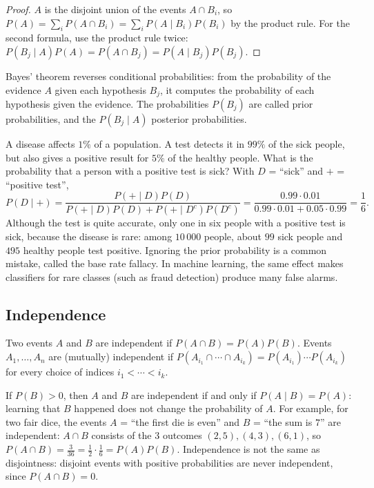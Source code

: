 \begin{proof}
    $A$ is the disjoint union of the events $A \cap B_i$, so $P(A) = \sum_i P(A \cap B_i) = \sum_i P(A \mid B_i)P(B_i)$ by the product rule. For the second formula, use the product rule twice: $P(B_j \mid A)P(A) = P(A \cap B_j) = P(A \mid B_j)P(B_j)$.
\end{proof}

Bayes' theorem reverses conditional probabilities: from the probability of the evidence $A$ given each hypothesis $B_j$, it computes the probability of each hypothesis given the evidence. The probabilities $P(B_j)$ are called prior probabilities, and the $P(B_j \mid A)$ posterior probabilities.

\begin{example}\label{L4-ex:medical}
    A disease affects $1\%$ of a population. A test detects it in $99\%$ of the sick people, but also gives a positive result for $5\%$ of the healthy people. What is the probability that a person with a positive test is sick? With $D$ = ``sick'' and $+$ = ``positive test'',
    \[P(D \mid +) = \frac{P(+ \mid D)P(D)}{P(+ \mid D)P(D) + P(+ \mid D^c)P(D^c)} = \frac{0.99 \cdot 0.01}{0.99 \cdot 0.01 + 0.05 \cdot 0.99} = \frac{1}{6}.\]
    Although the test is quite accurate, only one in six people with a positive test is sick, because the disease is rare: among $10\,000$ people, about $99$ sick people and $495$ healthy people test positive. Ignoring the prior probability is a common mistake, called the base rate fallacy. In machine learning, the same effect makes classifiers for rare classes (such as fraud detection) produce many false alarms.
\end{example}

\subsection{Independence}

\begin{definition}[Independence]\label{L4-def:independence}
    Two events $A$ and $B$ are independent if $P(A \cap B) = P(A)P(B)$. Events $A_1, \ldots, A_n$ are (mutually) independent if $P(A_{i_1} \cap \cdots \cap A_{i_k}) = P(A_{i_1}) \cdots P(A_{i_k})$ for every choice of indices $i_1 < \cdots < i_k$.
\end{definition}

If $P(B) > 0$, then $A$ and $B$ are independent if and only if $P(A \mid B) = P(A)$: learning that $B$ happened does not change the probability of $A$. For example, for two fair dice, the events $A$ = ``the first die is even'' and $B$ = ``the sum is $7$'' are independent: $A \cap B$ consists of the $3$ outcomes $(2, 5), (4, 3), (6, 1)$, so $P(A \cap B) = \frac{3}{36} = \frac{1}{2} \cdot \frac{1}{6} = P(A)P(B)$. Independence is not the same as disjointness: disjoint events with positive probabilities are never independent, since $P(A \cap B) = 0$.

